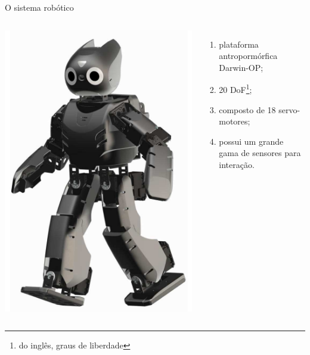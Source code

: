 \documentclass[aspectratio=169]{beamer}
\begin{document}
\begin{frame}[t]{O sistema robótico}
    \begin{columns}
            \includegraphics[width=.8\textwidth]{darwin-op}
            \begin{enumerate}
                \item plataforma antropormórfica Darwin-OP;
                \item 20 DoF\footnote{do inglês, graus de liberdade};
                \item composto de 18 servo-motores;
                \item possui um grande gama de sensores para interação.
            \end{enumerate}
    \end{columns}
\end{frame}
\end{document}
